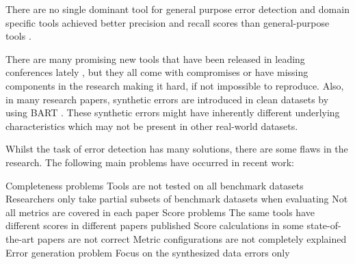 There are no single dominant tool for general purpose error detection and domain specific tools achieved better precision and recall scores than general-purpose tools \cite{Abedjan2016-jc}.

There are many promising new tools that have been released in leading conferences lately \cite{Mahdavi2019-zf,Heidari2019-ox,Neutatz2019-aw,Visengeriyeva2018-qz,Mahdavi2019-pk,Wang2019-jg}, but they all come with compromises or have missing components in the research making it hard, if not impossible to reproduce.
Also, in many research papers, synthetic errors are introduced in clean datasets by using BART \cite{Arocena2015-om}. These synthetic errors might have inherently different underlying characteristics which may not be present in other real-world datasets.

Whilst the task of error detection has many solutions, there are some flaws in the research. The following main problems have occurred in recent work:
\begin{outline}
    \1 Completeness problems
        \2 Tools are not tested on all benchmark datasets
        \2 Researchers only take partial subsets of benchmark datasets when evaluating
        \2 Not all metrics are covered in each paper
    \1 Score problems
        \2 The same tools have different scores in different papers published
        \2 Score calculations in some state-of-the-art papers are not correct
        \2 Metric configurations are not completely explained
    \1 Error generation problem
        \2 Focus on the synthesized data errors only
\end{outline}

